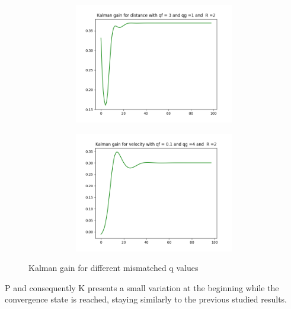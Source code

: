 \documentclass{article}
\begin{document}
        \begin{figure}[H]
            \centering 
            \begin{subfigure}{1\textwidth}  
                \begin{subfigure}{.5\textwidth}  
                    \centering 
                    \includegraphics[width=.7\linewidth]{./img/acc/K11_qf3_qg1_r2.png}
                    \caption{}
                \end{subfigure}
                \begin{subfigure}{.5\textwidth}  
                    \centering 
                    \includegraphics[width=.7\linewidth]{./img/acc/K22_qf01_qg4_r2.png}
                    \caption{}
                \end{subfigure}
            \end{subfigure}
            \caption{Kalman gain for different mismatched q values}
            \label{fig:accmisk}
        \end{figure}

        P and consequently K presents a small variation at the beginning while the convergence state is reached, staying similarly to the previous
        studied results.
\end{document}
